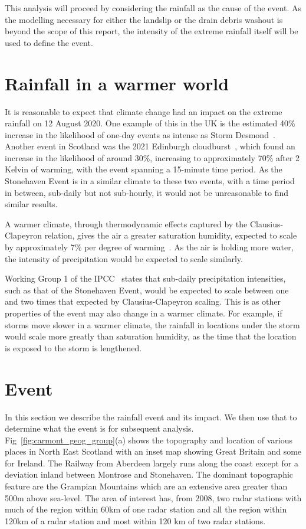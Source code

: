 \documentclass[11pt,a4paper]{article}
\begin{document}
This analysis will proceed by considering the rainfall as the cause of the event.
As the modelling necessary for either the landslip or the drain debris washout is beyond the scope of this report,
the intensity of the extreme rainfall itself will be used to define the event.

\section{Rainfall in a warmer world}\label{sec:warmerrainfall}

It is reasonable to expect that climate change had an impact on the extreme rainfall on 12 August 2020.
One example of this in the UK is the estimated 40\% increase
in the likelihood of one-day events as intense as Storm Desmond~\cite{Desmond_2015}.
Another event in Scotland was the 2021 Edinburgh cloudburst~\cite{tett2023edinburgh},
which found an increase in the likelihood of around 30\%,
increasing to approximately 70\% after 2 Kelvin of warming,
with the event spanning a 15-minute time period.
As the Stonehaven Event is in a similar climate to these two events,
with a time period in between,
sub-daily but not sub-hourly,
it would not be unreasonable to find similar results.

A warmer climate,
through thermodynamic effects captured by the Clausius-Clapeyron relation,
gives the air a greater saturation humidity,
expected to scale by approximately 7\% per degree of warming~\cite{Fowler_2021}.
As the air is holding more water,
the intensity of precipitation would be expected to scale similarly.

Working Group 1 of the IPCC~\cite{IPCC_2021} states that sub-daily precipitation intensities,
such as that of the Stonehaven Event,
would be expected to scale between one and two times that expected by Clausius-Clapeyron scaling.
This is as other properties of the event may also change in a warmer climate.
For example,
if storms move slower in a warmer climate,
the rainfall in locations under the storm would scale more greatly than saturation humidity,
as the time that the location is exposed to the storm is lengthened.

\section{Event}

In this section we describe the rainfall event and its impact. We then use that to determine what the event is for subsequent analysis. Fig~\ref{fig:carmont_geog_group}(a) shows the topography and location of various places in North East Scotland with an inset map showing Great Britain and some for Ireland. The Railway from Aberdeen largely runs along the coast except for a deviation inland between Montrose and Stonehaven.  The dominant topographic feature are the Grampian Mountains which are an extensive area greater than 500m above sea-level. The area of interest has, from 2008, two radar stations with much of the region within 60km of one radar station and  all the region within 120km of a radar station and most within 120 km of two radar stations. 
\end{document}
